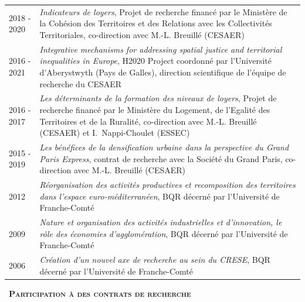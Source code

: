 \documentclass[a4paper,12pt]{article}
\newcommand{\smalltitre}[1]{%
	\noindent \textbullet~\textsc{\textbf{#1}}
	\smallskip
	}
\begin{document}
\begin{longtable}{@{}p{\annee}p{\texte}@{}}
2018 - 2020 & \og{}\textit{Indicateurs de loyers}\fg{}, Projet de recherche financé par le Ministère de la Cohésion des Territoires et des Relations avec les Collectivités Territoriales, co-direction avec M.-L. Breuillé (CESAER) \\
2016 - 2021 & \og{}\textit{Integrative mechanisms for addressing spatial justice and territorial inequalities in Europe}\fg{}, H2020 Project coordonné par l'Université d'Aberystwyth (Pays de Galles), direction scientifique de l'équipe de recherche du CESAER \\
2016 - 2017 & \og{}\textit{Les déterminants de la formation des niveaux de loyers}\fg{}, Projet de recherche financé par le Ministère du Logement, de l'Egalité des Territoires et de la Ruralité, co-direction avec M.-L. Breuillé (CESAER) et I.~Nappi-Choulet (ESSEC) \\
2015 - 2019 & \og{}\textit{Les bénéfices de la densification urbaine dans la perspective du Grand Paris Express}\fg{}, contrat de recherche avec la Société du Grand Paris, co-direction avec M.-L. Breuillé (CESAER) \\
2012 & \og{}\textit{Réorganisation des activités productives et recomposition des territoires dans l'espace euro-méditerranéen}\fg{}, BQR décerné par l'Université de Franche-Comté \\
2009 & \og{}\textit{Nature et organisation des activités industrielles et d'innovation, le rôle des économies d'agglomération}\fg{}, BQR décerné par l'Université de Franche-Comté \\
2006 & \og{}\textit{Création d'un nouvel axe de recherche au sein du CRESE}\fg{}, BQR décerné par l'Université de Franche-Comté \\

\end{longtable}

\smalltitre{Participation à des contrats de recherche}
\end{document}
